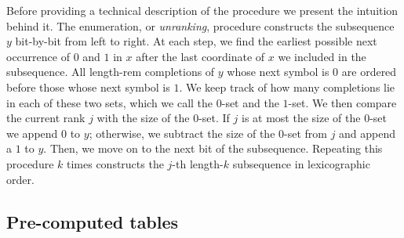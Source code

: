 \documentclass[11pt]{article}
\newcommand{\rem}{\mathrm{rem}}
\begin{document}
Before providing a technical description of the procedure we present the intuition behind it.
The enumeration, or \emph{unranking}, procedure constructs the subsequence $y$ bit-by-bit from left to right.
At each step, we find the earliest possible next occurrence of $0$ and $1$ in $x$ after the last coordinate of $x$ we included in the subsequence. 
All length-$\rem$ completions of $y$ whose next symbol is $0$ are ordered before those whose next symbol is $1$.
We keep track of how many completions lie in each of these two sets, which we call the $0$-set and the $1$-set.
We then compare the current rank $j$ with the size of the $0$-set. If $j$ is at most the size of the $0$-set we append $0$ to $y$; otherwise, we subtract the size of the $0$-set from $j$ and append a $1$ to $y$.
Then, we move on to the next bit of the subsequence.
Repeating this procedure $k$ times constructs the $j$-th length-$k$ subsequence in lexicographic order.



\subsection{Pre-computed tables}
\end{document}
